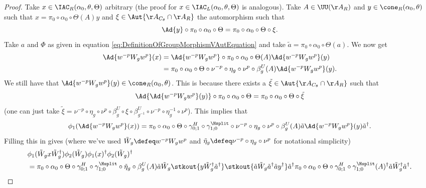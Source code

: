 \begin{proof}
	Take $x\in \IAC_R(\alpha_0,\theta,\Theta)$ arbitrary (the proof for $x\in \IAC_L(\alpha_0,\theta,\Theta)$ is analogous). Take $A\in\UU(\AA_R)$ and $y\in\cone_R(\alpha_0,\theta)$ such that $x=\pi_0\circ\alpha_0\circ\Theta(A)y$ and $\xi\in\Aut{\AA_{C_\theta}\cap \AA_R}$ the automorphism such that
	\begin{equation}
		\Ad{y}\circ\pi_0\circ\alpha_0\circ\Theta=\pi_0\circ\alpha_0\circ\Theta\circ\xi.
	\end{equation}
	Take $a$ and $\Phi$ as given in equation \eqref{eq:DefinitionOfGroupMorphismVAutEquation} and take $\tilde{a}=\pi_0\circ\alpha_0\circ\Theta(a)$. We now get
	\begin{align}
		\Ad{w^{-p}W_gw^{p}} (x) &=\Ad{w^{-p}W_gw^{p}}\circ\pi_0\circ\alpha_0\circ\Theta(A) \Ad{w^{-p}W_gw^{p}}(y)\\
		\nonumber
		&=\pi_0\circ\alpha_0\circ\Theta\circ\nu^{-p}\circ\eta_g\circ\nu^{p}\circ\beta_g^U(A) \Ad{w^{-p}W_gw^{p}}(y).
	\end{align}
	We still have that $\Ad{w^{-p}W_gw^{p}}(y)\in\cone_R(\alpha_0,\theta)$. This is because there exists a $\tilde{\xi}\in\Aut{\AA_{C_\theta}\cap \AA_R}$ such that
	\begin{equation}
		\Ad{\Ad{w^{-p}W_gw^{p}}(y)}\circ \pi_0\circ\alpha_0\circ\Theta=\pi_0\circ\alpha_0\circ\Theta\circ\tilde\xi
	\end{equation}
	(one can just take $\tilde\xi=\nu^{-p}\circ\eta_g\circ\nu^{p}\circ\beta_g^U\circ\xi\circ\beta_{g^{-1}}^U\circ\nu^{-p}\circ\eta_g^{-1}\circ\nu^{p}$). This implies that
	\begin{equation}\label{eq:lem:phi1phi2matchingCondition:Proof_W_g_PartAppendix}
		\phi_1(\Ad{w^{-p}W_gw^{p}}(x))=\pi_0\circ\alpha_0\circ\Theta\circ\gamma^{H}_{0;1}\circ\gamma^{\Hsplit}_{1;0}\circ\nu^{-p}\circ\eta_g\circ\nu^{p}\circ\beta_g^U(A)\tilde{a}\Ad{w^{-p}W_gw^{p}}(y)\tilde{a}^\dagger.
	\end{equation}
	Filling this in gives (where we've used $\tilde{W}_g\defeq w^{-p}W_g w^{p}$ and $\tilde{\eta}_g\defeq \nu^{-p}\circ\eta_g\circ\nu^{p}$ for notational simplicity)
	\begin{align}
		\label{eq:phi1phi2matchingConditionEquationAppendix}
		&\phi_1(\tilde{W}_gx\tilde{W}_g^\dagger)\phi_2(\tilde{W}_g)\phi_1(x)^\dagger\phi_2(\tilde{W}_g)^\dagger\\
		\nonumber
		&=\pi_0\circ\alpha_0\circ\Theta\circ\gamma^{H}_{0;1}\circ\gamma^{\Hsplit}_{1;0}\circ\tilde{\eta}_g\circ\beta_g^U(A)\tilde{a}\tilde{W}_g\stkout{y\tilde{W}_g^\dagger\tilde{a}^\dagger}\stkout{\tilde{a}\tilde{W}_g\tilde{a}^\dagger\tilde{a}y^\dagger}\tilde{a}^\dagger\pi_0\circ\alpha_0\circ\Theta\circ\gamma^{H}_{0;1}\circ\gamma^{\Hsplit}_{1;0}(A)^\dagger\tilde{a}\tilde{W}_g^\dagger\tilde{a}^\dagger.

\end{align}
\end{proof}
